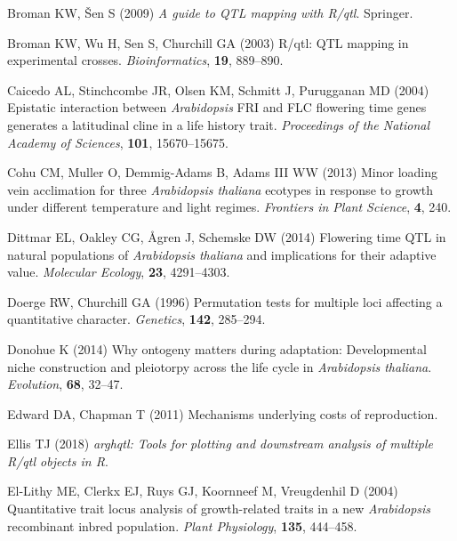 \documentclass[]{article}
\begin{document}
\leavevmode\hypertarget{ref-Broman2009}{}%
Broman KW, Šen S (2009) \emph{A guide to QTL mapping with R/qtl}. Springer.

\leavevmode\hypertarget{ref-Broman2003}{}%
Broman KW, Wu H, Sen S, Churchill GA (2003) R/qtl: QTL mapping in experimental crosses. \emph{Bioinformatics}, \textbf{19}, 889--890.

\leavevmode\hypertarget{ref-caicedo2004epistatic}{}%
Caicedo AL, Stinchcombe JR, Olsen KM, Schmitt J, Purugganan MD (2004) Epistatic interaction between \emph{Arabidopsis} FRI and FLC flowering time genes generates a latitudinal cline in a life history trait. \emph{Proceedings of the National Academy of Sciences}, \textbf{101}, 15670--15675.

\leavevmode\hypertarget{ref-cohu2013minor}{}%
Cohu CM, Muller O, Demmig-Adams B, Adams III WW (2013) Minor loading vein acclimation for three \emph{Arabidopsis thaliana} ecotypes in response to growth under different temperature and light regimes. \emph{Frontiers in Plant Science}, \textbf{4}, 240.

\leavevmode\hypertarget{ref-dittmar2014flowering}{}%
Dittmar EL, Oakley CG, Ågren J, Schemske DW (2014) Flowering time QTL in natural populations of \emph{Arabidopsis thaliana} and implications for their adaptive value. \emph{Molecular Ecology}, \textbf{23}, 4291--4303.

\leavevmode\hypertarget{ref-doerge1996permutation}{}%
Doerge RW, Churchill GA (1996) Permutation tests for multiple loci affecting a quantitative character. \emph{Genetics}, \textbf{142}, 285--294.

\leavevmode\hypertarget{ref-donohue2014ontogeny}{}%
Donohue K (2014) Why ontogeny matters during adaptation: Developmental niche construction and pleiotorpy across the life cycle in \emph{Arabidopsis thaliana}. \emph{Evolution}, \textbf{68}, 32--47.

\leavevmode\hypertarget{ref-edward2011mechanisms}{}%
Edward DA, Chapman T (2011) Mechanisms underlying costs of reproduction.

\leavevmode\hypertarget{ref-ellis_arghqtl}{}%
Ellis TJ (2018) \emph{\textup{arghqtl}: Tools for plotting and downstream analysis of multiple R/qtl objects in R}.

\leavevmode\hypertarget{ref-el2004quantitative}{}%
El-Lithy ME, Clerkx EJ, Ruys GJ, Koornneef M, Vreugdenhil D (2004) Quantitative trait locus analysis of growth-related traits in a new \emph{Arabidopsis} recombinant inbred population. \emph{Plant Physiology}, \textbf{135}, 444--458.
\end{document}
